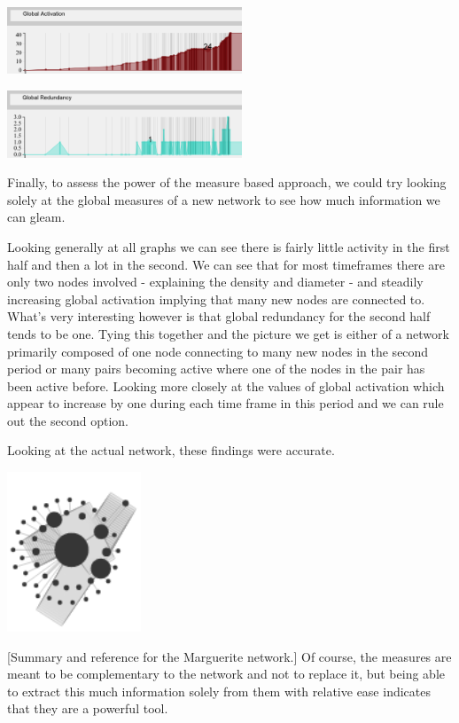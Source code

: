\begin{multicols}{2}
\begin{center}
\end{center}
\begin{center}
\includegraphics[trim={0 0 0 0}, width=70mm]{./Figures/margueriteGlobalActivation.png}
\end{center}
\begin{center}
\includegraphics[trim={0 0 0 0}, width=70mm]{./Figures/margueriteGlobalRedundancy.png}
\end{center}
\columnbreak
[Reference]
Finally, to assess the power of the measure based approach, we could try looking solely at the global measures of a new network to see how much information we can gleam. 

Looking generally at all graphs we can see there is fairly little activity in the first half and then a lot in the second. We can see that for most timeframes there are only two nodes involved - explaining the density and diameter - and steadily increasing global activation implying that many new nodes are connected to. What's very interesting however is that global redundancy for the second half tends to be one. Tying this together and the picture we get is either of a network primarily composed of one node connecting to many new nodes in the second period or many pairs becoming active where one of the nodes in the pair has been active before. Looking more closely at the values of global activation which appear to increase by one during each time frame in this period and we can rule out the second option.
\end{multicols}

Looking at the actual network, these findings were accurate. 
\begin{center}
\includegraphics[trim={0 0 0 0}, width=40mm]{./Figures/margueriteNetwork.png}
\end{center}
[Summary and reference for the Marguerite network.]
Of course, the measures are meant to be complementary to the network and not to replace it, but being able to extract this much information solely from them with relative ease indicates that they are a powerful tool.



